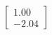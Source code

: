 \documentclass[preview]{standalone}
\begin{document}
\begin{align*}
\begin{bmatrix} 1.00 \\ -2.04 \end{bmatrix}
\end{align*}
\end{document}
